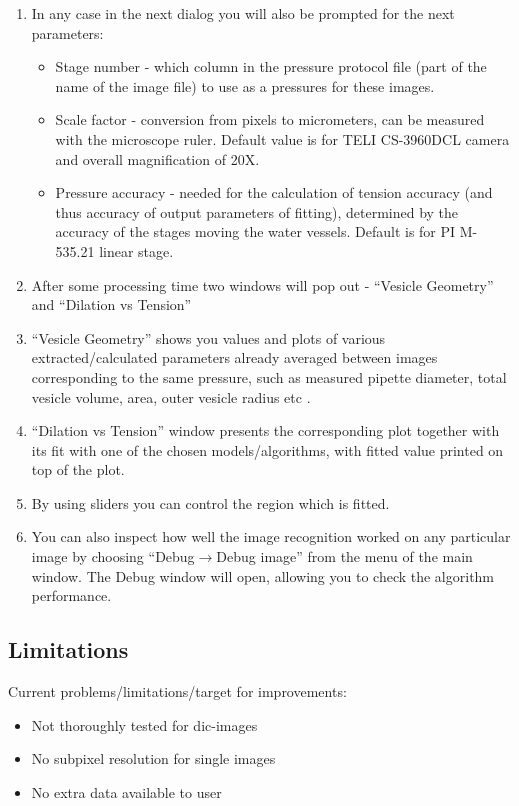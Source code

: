 \begin{enumerate}
	\item In any case in the next dialog you will also be prompted for the next parameters:
	\begin{itemize}
		\item Stage number - which column in the pressure protocol file (part of the name of the image file) to use as a pressures for these images.
		\item Scale factor - conversion from pixels to micrometers, can be measured with the microscope ruler. Default value is for TELI CS-3960DCL camera and overall magnification of 20X.
		\item Pressure accuracy - needed for the calculation of tension accuracy (and thus accuracy of output parameters of fitting), determined by the accuracy of the stages moving the water vessels. Default is for PI M-535.21 linear stage.
	\end{itemize}
	\item After some processing time two windows will pop out - ``Vesicle Geometry'' and ``Dilation vs Tension''
	\item ``Vesicle Geometry'' shows you values and plots of various extracted/calculated parameters already averaged between images corresponding to the same pressure, such as measured pipette diameter, total vesicle volume, area, outer vesicle radius etc  .
	\item ``Dilation vs Tension'' window presents the corresponding plot together with its fit with one of the chosen models/algorithms, with fitted value printed on top of the plot.
	\item By using sliders you can control the region which is fitted.
	\item You can also inspect how well the image recognition worked on any particular image by choosing ``Debug$\rightarrow$Debug image'' from the menu of the main window. The Debug window will open, allowing you to check the algorithm performance.
\end{enumerate}

\subsection{Limitations}\label{vampy-limits}
Current problems/limitations/target for improvements:
\begin{itemize}
	\item Not thoroughly tested for dic-images
	\item No subpixel resolution for single images
	\item No extra data available to user
\end{itemize}
